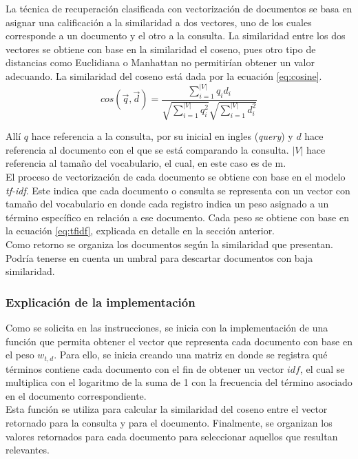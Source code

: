 La técnica de recuperación clasificada con vectorización de documentos se basa en asignar una calificación a la similaridad a dos vectores, uno de los cuales corresponde a un documento y el otro a la consulta. La similaridad entre los dos vectores se obtiene con base en la similaridad el coseno, pues otro tipo de distancias como Euclidiana o Manhattan no permitirían obtener un valor adecuando. La similaridad del coseno está dada por la ecuación \ref{eq:cosine}.
\begin{equation}
    cos(\vec{q}, \vec{d}) = \frac{\sum_{i=1}^{|V|}q_id_i}{\sqrt{\sum_{i=1}^{|V|}q_i^2} \sqrt{\sum_{i=1}^{|V|}d_i^2}}
    \label{eq:cosine}
\end{equation}

Allí $q$ hace referencia a la consulta, por su inicial en ingles (\textit{query}) y $d$ hace referencia al documento con el que se está comparando la consulta. $|V|$ hace referencia al tamaño del vocabulario, el cual, en este caso es de m.\\

El proceso de vectorización de cada documento se obtiene con base en el modelo \textit{tf-idf}. Este indica que cada documento o consulta se representa con un vector con tamaño del vocabulario en donde cada registro indica un peso asignado a un término específico en relación a ese documento. Cada peso se obtiene con base en la ecuación \ref{eq:tfidf}, explicada en detalle en la sección anterior. \\

Como retorno se organiza los documentos según la similaridad que presentan. Podría tenerse en cuenta un umbral para descartar documentos con baja similaridad.

\subsubsection{Explicación de la implementación}
Como se solicita en las instrucciones, se inicia con la implementación de una función que permita obtener el vector que representa cada documento con base en el peso $w_{t,d}$. Para ello, se inicia creando una matriz en donde se registra qué términos contiene cada documento con el fin de obtener un vector $idf$, el cual se multiplica con el logaritmo de la suma de 1 con la frecuencia del término asociado en el documento correspondiente.\\

Esta función se utiliza para calcular la similaridad del coseno entre el vector retornado para la consulta y para el documento. Finalmente, se organizan los valores retornados para cada documento para seleccionar aquellos que resultan relevantes.